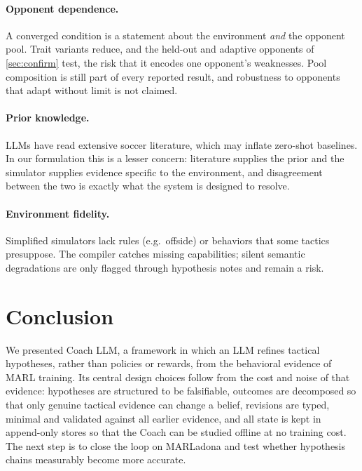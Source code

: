 \documentclass[11pt]{article}
\begin{document}
\paragraph{Opponent dependence.}
A converged condition is a statement about the environment \emph{and} the opponent pool.
Trait variants reduce, and the held-out and adaptive opponents of \cref{sec:confirm} test, the risk that it encodes one opponent's weaknesses.
Pool composition is still part of every reported result, and robustness to opponents that adapt without limit is not claimed.

\paragraph{Prior knowledge.}
LLMs have read extensive soccer literature, which may inflate zero-shot baselines.
In our formulation this is a lesser concern: literature supplies the prior and the simulator supplies evidence specific to the environment, and disagreement between the two is exactly what the system is designed to resolve.

\paragraph{Environment fidelity.}
Simplified simulators lack rules (e.g.\ offside) or behaviors that some tactics presuppose.
The compiler catches missing capabilities; silent semantic degradations are only flagged through hypothesis notes and remain a risk.

\section{Conclusion}
\label{sec:conclusion}

We presented Coach LLM, a framework in which an LLM refines tactical hypotheses, rather than policies or rewards, from the behavioral evidence of MARL training.
Its central design choices follow from the cost and noise of that evidence: hypotheses are structured to be falsifiable, outcomes are decomposed so that only genuine tactical evidence can change a belief, revisions are typed, minimal and validated against all earlier evidence, and all state is kept in append-only stores so that the Coach can be studied offline at no training cost.
The next step is to close the loop on MARLadona and test whether hypothesis chains measurably become more accurate.
\end{document}
